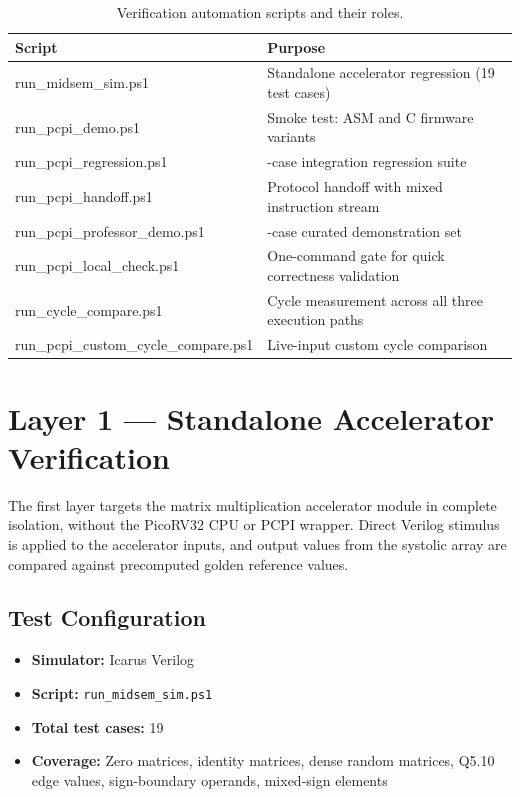 ﻿\documentclass[12pt,a4paper]{report}
\renewcommand{\arraystretch}{1.2}
\begin{document}
\begin{table}[H]
\centering
\small
\setlength{\tabcolsep}{6pt}
\renewcommand{\arraystretch}{1.3}
\begin{tabularx}{\textwidth}{
  >{\ttfamily\raggedright\arraybackslash}p{}
  >{\raggedright\arraybackslash}X
}
\toprule
\textbf{Script} & \textbf{Purpose} \\
\midrule
run\_midsem\_sim.ps1            & Standalone accelerator regression (19 test cases) \\
run\_pcpi\_demo.ps1             & Smoke test: ASM and C firmware variants \\
run\_pcpi\_regression.ps1       & 8-case integration regression suite \\
run\_pcpi\_handoff.ps1          & Protocol handoff with mixed instruction stream \\
run\_pcpi\_professor\_demo.ps1  & 5-case curated demonstration set \\
run\_pcpi\_local\_check.ps1     & One-command gate for quick correctness validation \\
run\_cycle\_compare.ps1         & Cycle measurement across all three execution paths \\
run\_pcpi\_custom\_cycle\_compare.ps1 & Live-input custom cycle comparison \\
\bottomrule
\end{tabularx}
\caption{Verification automation scripts and their roles.}
\label{tab:scripts}
\end{table}

\section{Layer 1 --- Standalone Accelerator Verification}

The first layer targets the matrix multiplication accelerator module in complete isolation, without the PicoRV32 CPU or PCPI wrapper.
Direct Verilog stimulus is applied to the accelerator inputs, and output values from the systolic array are compared against precomputed golden reference values.

\subsection{Test Configuration}

\begin{itemize}
    \item \textbf{Simulator:} Icarus Verilog
    \item \textbf{Script:} \texttt{run\_midsem\_sim.ps1}
    \item \textbf{Total test cases:} 19
    \item \textbf{Coverage:} Zero matrices, identity matrices, dense random matrices, Q5.10 edge values, sign-boundary operands, mixed-sign elements
\end{itemize}
\end{document}
